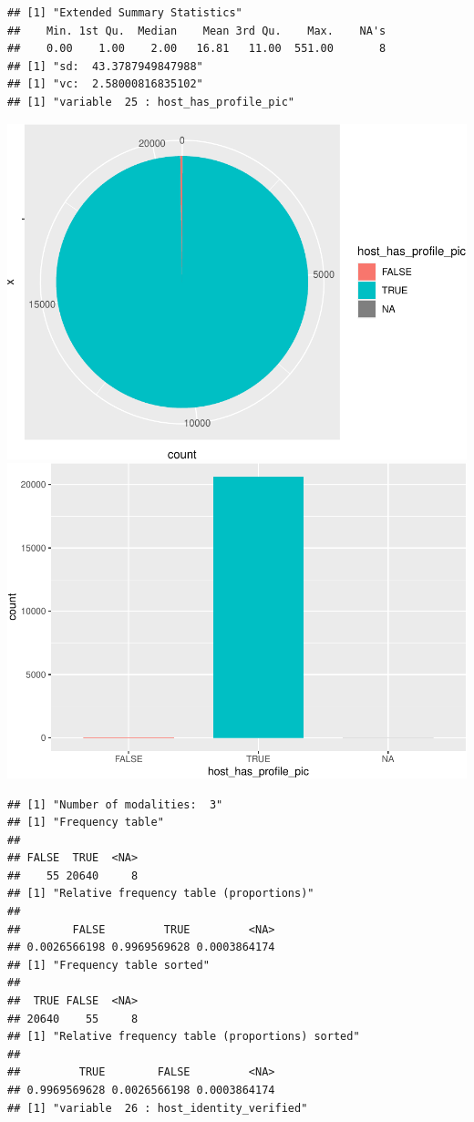 \begin{verbatim}
## [1] "Extended Summary Statistics"
##    Min. 1st Qu.  Median    Mean 3rd Qu.    Max.    NA's 
##    0.00    1.00    2.00   16.81   11.00  551.00       8 
## [1] "sd:  43.3787949847988"
## [1] "vc:  2.58000816835102"
## [1] "variable  25 : host_has_profile_pic"
\end{verbatim}

\includegraphics{anal_files/figure-latex/unnamed-chunk-9-8.pdf}
\includegraphics{anal_files/figure-latex/unnamed-chunk-9-9.pdf}

\begin{verbatim}
## [1] "Number of modalities:  3"
## [1] "Frequency table"
## 
## FALSE  TRUE  <NA> 
##    55 20640     8 
## [1] "Relative frequency table (proportions)"
## 
##        FALSE         TRUE         <NA> 
## 0.0026566198 0.9969569628 0.0003864174 
## [1] "Frequency table sorted"
## 
##  TRUE FALSE  <NA> 
## 20640    55     8 
## [1] "Relative frequency table (proportions) sorted"
## 
##         TRUE        FALSE         <NA> 
## 0.9969569628 0.0026566198 0.0003864174 
## [1] "variable  26 : host_identity_verified"
\end{verbatim}

